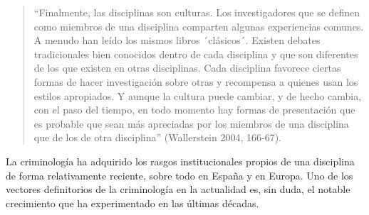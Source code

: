 \documentclass[
  spanish,
  letterpaper,
  DIV=11,
  numbers=noendperiod]{scrreprt}
\begin{document}
\begin{quote}
``Finalmente, las disciplinas son culturas. Los investigadores que se
definen como miembros de una disciplina comparten algunas experiencias
comunes. A menudo han leído los mismos libros ´clásicos´. Existen
debates tradicionales bien conocidos dentro de cada disciplina y que son
diferentes de los que existen en otras disciplinas. Cada disciplina
favorece ciertas formas de hacer investigación sobre otras y recompensa
a quienes usan los estilos apropiados. Y aunque la cultura puede
cambiar, y de hecho cambia, con el paso del tiempo, en todo momento hay
formas de presentación que es probable que sean más apreciadas por los
miembros de una disciplina que de los de otra disciplina'' (Wallerstein
2004, 166-67).
\end{quote}

La criminología ha adquirido los rasgos institucionales propios de una
disciplina de forma relativamente reciente, sobre todo en España y en
Europa. Uno de los vectores definitorios de la criminología en la
actualidad es, sin duda, el notable crecimiento que ha experimentado en
las últimas décadas.
\end{document}
